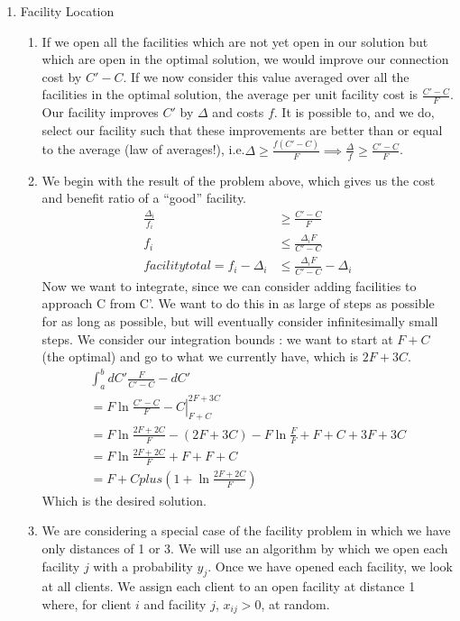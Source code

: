 \documentclass[a4paper]{article}
\begin{document}
\begin{enumerate}
\item Facility Location
	\begin{enumerate}
		\item If we open all the facilities which are not yet open in our solution but which are open in the optimal solution, we would improve our connection cost by $C' - C$.  If we now consider this value averaged over all the facilities in the optimal solution, the average per unit facility cost is $\frac{C' - C}{F}$.  Our facility improves $C'$ by $\Delta$ and costs $f$.  It is possible to, and we do, select our facility such that these improvements are better than or equal to the average (law of averages!), i.e.$\Delta \geq \frac{f(C' - C)}{F} \implies \frac{\Delta}{f} \geq \frac{C' - C}{F}$.
		\item We begin with the result of the problem above, which gives us the cost and benefit ratio of a ``good'' facility.
			\begin{align}
				\frac{\Delta_i}{f_i} &\geq \frac{C' - C}{F} \\
				f_i &\leq \frac{\Delta_i F}{C' - C} \\
				facilitytotal = f_i - \Delta_i &\leq \frac{\Delta_i F}{C' - C} - \Delta_i
			\end{align}
			Now we want to integrate, since we can consider adding facilities to approach C from C'.  We want to do this in as large of steps as possible for as long as possible, but will eventually consider infinitesimally small steps.  We consider our integration bounds : we want to start at $F+C$ (the optimal) and go to what we currently have, which is $2F+3C$.
			\begin{align}
				\int_a^b{dC' \frac{F}{C' - C} - dC'} \\
				= \left. F\ln \frac{C' - C}{F} - C \right|_{F+C}^{2F+3C} \\
				= F \ln \frac{2F + 2C}{F} - (2F + 3C) - F \ln \frac{F}{F} + F + C+ 3F + 3C \\
				= F \ln \frac{2F + 2C}{F} + F + F + C \\
				= F + C plus (1+\ln\frac{2F + 2C}{F})
			\end{align}
			Which is the desired solution.
		\item We are considering a special case of the facility problem in which we have only distances of 1 or 3.  We will use an algorithm by which we open each facility $j$ with a probability $y_j$.  Once we have opened each facility, we look at all clients.  We assign each client to an open facility at distance 1 where, for client $i$ and facility $j$, $x_{ij} > 0$, at random.


\end{enumerate}
\end{enumerate}
\end{document}
